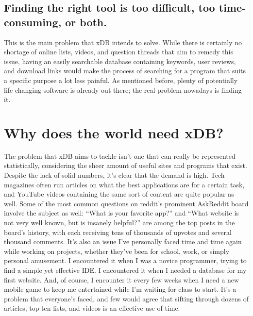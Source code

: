 \documentclass[letterpaper,12pt,titlepage]{article}
\begin{document}
\subsection{Finding the right tool is too difficult, too time-consuming, or both.}
This is the main problem that xDB intends to solve. While there is certainly no shortage of online lists, videos, and question threads that aim to remedy this issue, having an easily searchable database containing keywords, user reviews, and download links would make the process of searching for a program that suits a specific purpose a lot less painful. As mentioned before, plenty of potentially life-changing software is already out there; the real problem nowadays is finding it.

\section{Why does the world need xDB?}
The problem that xDB aims to tackle isn't one that can really be represented statistically, considering the sheer amount of useful sites and programs that exist. Despite the lack of solid numbers, it's clear that the demand is high. Tech magazines often run articles on what the best applications are for a certain task, and YouTube videos containing the same sort of content are quite popular as well. Some of the most common questions on reddit's prominent AskReddit board involve the subject as well: “What is your favorite app?” and “What website is not very well known, but is insanely helpful?” are among the top posts in the board's history, with each receiving tens of thousands of upvotes and several thousand comments. It's also an issue I've personally faced time and time again while working on projects, whether they've been for school, work, or simply personal amusement. I encountered it when I was a novice programmer, trying to find a simple yet effective IDE. I encountered it when I needed a database for my first website. And, of course, I encounter it every few weeks when I need a new mobile game to keep me entertained while I'm waiting for class to start. It's a problem that everyone's faced, and few would agree that sifting through dozens of articles, top ten lists, and videos is an effective use of time.
\end{document}
